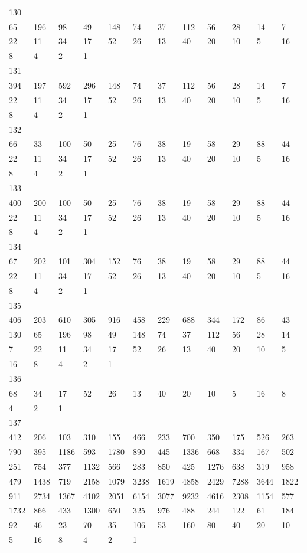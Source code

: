 \begin{longtable}{llllllllllll}
130&&&&&&&&&&&\\
65& 196& 98& 49& 148& 74& 37& 112& 56& 28& 14& 7\\
22& 11& 34& 17& 52& 26& 13& 40& 20& 10& 5& 16\\
8& 4& 2& 1& \\

131&&&&&&&&&&&\\
394& 197& 592& 296& 148& 74& 37& 112& 56& 28& 14& 7\\
22& 11& 34& 17& 52& 26& 13& 40& 20& 10& 5& 16\\
8& 4& 2& 1& \\

132&&&&&&&&&&&\\
66& 33& 100& 50& 25& 76& 38& 19& 58& 29& 88& 44\\
22& 11& 34& 17& 52& 26& 13& 40& 20& 10& 5& 16\\
8& 4& 2& 1& \\

133&&&&&&&&&&&\\
400& 200& 100& 50& 25& 76& 38& 19& 58& 29& 88& 44\\
22& 11& 34& 17& 52& 26& 13& 40& 20& 10& 5& 16\\
8& 4& 2& 1& \\

134&&&&&&&&&&&\\
67& 202& 101& 304& 152& 76& 38& 19& 58& 29& 88& 44\\
22& 11& 34& 17& 52& 26& 13& 40& 20& 10& 5& 16\\
8& 4& 2& 1& \\

135&&&&&&&&&&&\\
406& 203& 610& 305& 916& 458& 229& 688& 344& 172& 86& 43\\
130& 65& 196& 98& 49& 148& 74& 37& 112& 56& 28& 14\\
7& 22& 11& 34& 17& 52& 26& 13& 40& 20& 10& 5\\
16& 8& 4& 2& 1& \\

136&&&&&&&&&&&\\
68& 34& 17& 52& 26& 13& 40& 20& 10& 5& 16& 8\\
4& 2& 1& \\

137&&&&&&&&&&&\\
412& 206& 103& 310& 155& 466& 233& 700& 350& 175& 526& 263\\
790& 395& 1186& 593& 1780& 890& 445& 1336& 668& 334& 167& 502\\
251& 754& 377& 1132& 566& 283& 850& 425& 1276& 638& 319& 958\\
479& 1438& 719& 2158& 1079& 3238& 1619& 4858& 2429& 7288& 3644& 1822\\
911& 2734& 1367& 4102& 2051& 6154& 3077& 9232& 4616& 2308& 1154& 577\\
1732& 866& 433& 1300& 650& 325& 976& 488& 244& 122& 61& 184\\
92& 46& 23& 70& 35& 106& 53& 160& 80& 40& 20& 10\\
5& 16& 8& 4& 2& 1& \\


\end{longtable}
